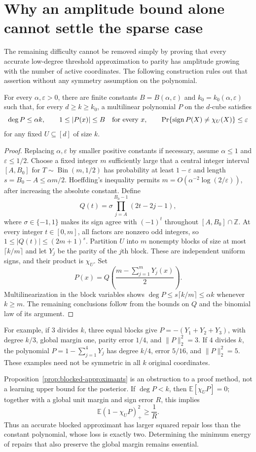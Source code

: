 \section{Why an amplitude bound alone cannot settle the sparse case}
\label{sec:blocked-obstruction}
The remaining difficulty cannot be removed simply by proving that every
accurate low-degree threshold approximation to parity has amplitude growing
with the number of active coordinates. The following construction rules
out that assertion without any symmetry assumption on the polynomial.

\begin{proposition}
\label{prop:blocked-approximants}
For every $\alpha,\varepsilon>0$, there are finite constants
$B=B(\alpha,\varepsilon)$ and $k_0=k_0(\alpha,\varepsilon)$ such that,
for every $d\ge k\ge k_0$, a multilinear polynomial $P$ on the $d$-cube
satisfies
\[
 \deg P\le\alpha k,\qquad
 1\le |P(x)|\le B\quad\hbox{for every }x,\qquad
 \Pr\{\operatorname{sign}P(X)\ne\chi_U(X)\}\le\varepsilon
\]
for any fixed $U\subseteq[d]$ of size $k$.
\end{proposition}
\begin{proof}
Replacing $\alpha,\varepsilon$ by smaller positive constants if necessary,
assume $\alpha\le1$ and $\varepsilon\le1/2$.
Choose a fixed integer $m$ sufficiently large that a central integer
interval $[A,B_0]$ for $T\sim\operatorname{Bin}(m,1/2)$ has probability
at least $1-\varepsilon$ and length $s=B_0-A\le\alpha m/2$.
Hoeffding's inequality permits $m=O(\alpha^{-2}\log(2/\varepsilon))$,
after increasing the absolute constant. Define
\[
 Q(t)=\sigma\prod_{j=A}^{B_0-1}(2t-2j-1),
\]
where $\sigma\in\{-1,1\}$ makes its sign agree with $(-1)^t$ throughout
$[A,B_0]\cap\mathbb Z$. At every integer $t\in[0,m]$, all factors are
nonzero odd integers, so $1\le|Q(t)|\le(2m+1)^s$.
Partition $U$ into $m$ nonempty blocks of size at most $\lceil k/m\rceil$
and let $Y_j$ be the parity of the $j$th block. These are independent
uniform signs, and their product is $\chi_U$. Set
\[
 P(x)=Q\!\left(\frac{m-\sum_{j=1}^mY_j(x)}2\right).
\]
Multilinearization in the block variables shows
$\deg P\le s\lceil k/m\rceil\le\alpha k$ whenever $k\ge m$.
The remaining conclusions follow from the bounds on $Q$ and the
binomial law of its argument.
\end{proof}

For example, if $3$ divides $k$, three equal blocks give
$P=-(Y_1+Y_2+Y_3)$, with degree $k/3$, global margin one, parity error
$1/4$, and $\|P\|_2^2=3$. If $4$ divides $k$, the polynomial
$P=1-\sum_{j=1}^4Y_j$ has degree $k/4$, error $5/16$, and
$\|P\|_2^2=5$. These examples need not be symmetric in all $k$ original
coordinates.

Proposition~\ref{prop:blocked-approximants} is an obstruction to a proof
method, not a learning upper bound for the posterior. If $\deg P<k$,
then $\mathbb E[\chi_U P]=0$; together with a global unit margin and
sign error $R$, this implies
\[
 \mathbb E(1-\chi_U P)_+^2\ge\frac1R.
\]
Thus an accurate blocked approximant has larger squared repair loss
than the constant polynomial, whose loss is exactly two. Determining
the minimum energy of repairs that also preserve the global margin
remains essential.
